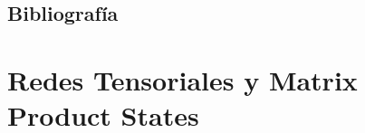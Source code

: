 \documentclass[12pt]{extarticle}
\numberwithin{equation}{section}
\begin{document}
\begin{refsection}
\newpage

\section{Bibliograf\'ia} \label{sec:bibliography}

\printbibliography[heading=none]

\end{refsection}
\newpage

\appendix
\section{Redes Tensoriales y Matrix Product States}
\label{sec:anexoredes}
\end{document}
